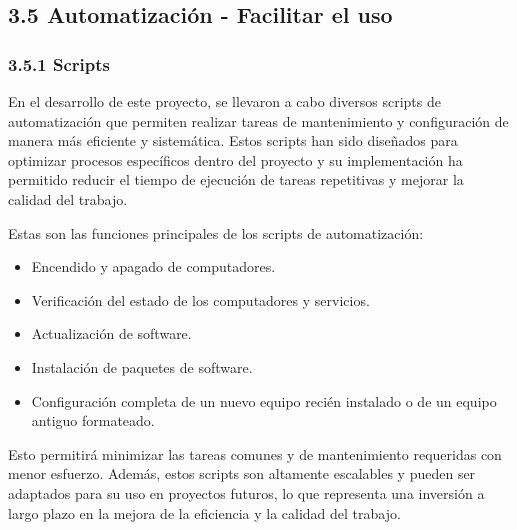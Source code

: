 \begin{doublespace}
\begin{multicols}{2}
    \subsection{3.5 Automatización - Facilitar el uso}

    \subsubsection{3.5.1 Scripts}

    En el desarrollo de este proyecto, se llevaron a cabo diversos scripts de automatización que permiten realizar tareas de mantenimiento y configuración de manera más eficiente y sistemática. Estos scripts han sido diseñados para optimizar procesos específicos dentro del proyecto y su implementación ha permitido reducir el tiempo de ejecución de tareas repetitivas y mejorar la calidad del trabajo.

    Estas son las funciones principales de los scripts de automatización:

    \begin{itemize}
        \item Encendido y apagado de computadores.
        \item Verificación del estado de los computadores y servicios.
        \item Actualización de software.
        \item Instalación de paquetes de software.
        \item Configuración completa de un nuevo equipo recién instalado o de un equipo antiguo formateado.
    \end{itemize}
   
    Esto permitirá minimizar las tareas comunes y de mantenimiento requeridas con menor esfuerzo. Además, estos scripts son altamente escalables y pueden ser adaptados para su uso en proyectos futuros, lo que representa una inversión a largo plazo en la mejora de la eficiencia y la calidad del trabajo.

\end{multicols}

\mylinespacing
\mylinespacing
\begin{tightcenter}
\end{tightcenter}
\end{doublespace}
